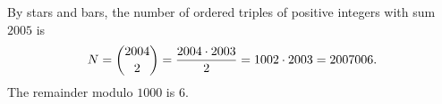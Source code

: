 By stars and bars, the number of ordered triples of positive integers with sum $2005$ is
\[N=\dbinom{2004}{2}=\dfrac{2004\cdot2003}{2}=1002\cdot2003=2007006.\]
The remainder modulo $1000$ is $\boxed{6}$.
